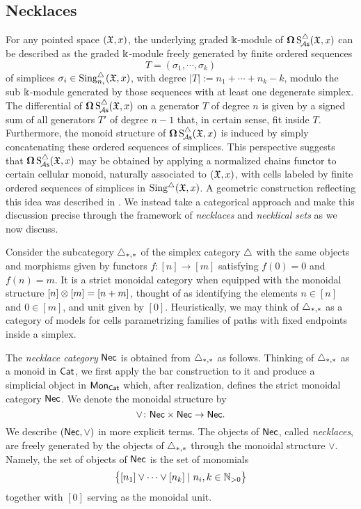 \subsection{Necklaces}

For any pointed space $(\mathfrak{X},x)$, the underlying graded $\Bbbk$-module of $\operatorname{\mathbf{\Omega}} \operatorname{S^{\triangle}_{\!{\mathcal{A}\mathsf{s}}}}(\mathfrak{X},x)$ can be described as the graded $\Bbbk$-module freely generated by finite ordered sequences
\[T=(\sigma_1, \cdots, \sigma_k)\]
of simplices $\sigma_i \in \text{Sing}^{\triangle}_{n_i}(\mathfrak{X},x)$, with degree $|T|:= n_1 + \cdots + n_k -k$, modulo the sub $\Bbbk$-module generated by those sequences with at least one degenerate simplex. The differential of $\operatorname{\mathbf{\Omega}} \operatorname{S^{\triangle}_{\!{\mathcal{A}\mathsf{s}}}}(\mathfrak{X},x)$ on a generator $T$ of degree $n$ is given by a signed sum of all generators $T'$ of degree $n-1$ that, in certain sense, fit inside $T$. Furthermore, the monoid structure of $\operatorname{\mathbf{\Omega}} \operatorname{S^{\triangle}_{\!{\mathcal{A}\mathsf{s}}}}(\mathfrak{X},x)$ is induced by simply concatenating these ordered sequences of simplices. This perspective suggests that $\operatorname{\mathbf{\Omega}} \operatorname{S^{\triangle}_{\!{\mathcal{A}\mathsf{s}}}}(\mathfrak{X},x)$ may be obtained by applying a normalized chains functor to certain cellular monoid, naturally associated to $(\mathfrak{X},x)$, with cells labeled by finite ordered sequences of simplices in $\operatorname{Sing^{\triangle}}(\mathfrak{X},x)$. A geometric construction reflecting this idea was described in \cite{baues1980geometry}. We instead take a categorical approach and make this discussion precise through the framework of \textit{necklaces} and \textit{necklical sets} as we now discuss.

Consider the subcategory $\triangle_{*,*}$ of the simplex category $\triangle$ with the same objects and morphisms given by functors $f \colon [n] \to [m]$ satisfying $f(0) = 0$ and $f(n) = m$.
It is a strict monoidal category when equipped with the monoidal structure $[n] \otimes [m] = [n+m]$, thought of as identifying the elements $n \in [n]$ and $0 \in [m]$, and unit given by $[0]$. Heuristically, we may think of $\triangle_{*,*}$ as a category of models for cells parametrizing families of paths with fixed endpoints inside a simplex.


The \textit{necklace category} $\mathsf{Nec}$ is obtained from $\triangle_{*,*}$ as follows.
Thinking of $\triangle_{*,*}$ as a monoid in $\mathsf{Cat}$, we first apply the bar construction to it and produce a simplicial object in $\mathsf{Mon}_{\mathsf{Cat}}$ which, after realization, defines the strict monoidal category $\mathsf{Nec}$.
We denote the monoidal structure by
\[
\vee \colon \mathsf{Nec} \times \mathsf{Nec} \to \mathsf{Nec}.
\]
We describe $(\mathsf{Nec}, \vee)$ in more explicit terms.
The objects of $\mathsf{Nec}$, called \textit{necklaces}, are freely generated by the objects of $\triangle_{*,*}$ through the monoidal structure $\vee$.
Namely, the set of objects of $\mathsf{Nec}$ is the set of monomials
\[
\big\{ [n_1] \vee \dots \vee[n_k] \mid n_i, k \in \mathbb{N}_{>0} \big\}
\]
together with $[0]$ serving as the monoidal unit.

